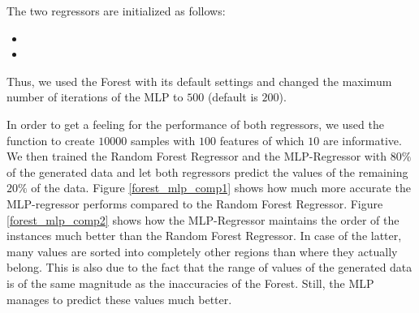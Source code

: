 	The two regressors are initialized as follows:
	\begin{itemize}
		\item {}
		\item {}
	\end{itemize}
	Thus, we used the Forest with its default settings and changed the maximum number of iterations of the MLP to $500$ (default is $200$).
	
	In order to get a feeling for the performance of both regressors, we used the function  to create $10000$ samples with $100$ features of which $10$ are informative. We then trained the Random Forest Regressor and the MLP-Regressor with $80\%$ of the generated data and let both regressors predict the values of the remaining $20\%$ of the data. Figure \ref{forest_mlp_comp1} shows how much more accurate the MLP-regressor performs compared to the Random Forest Regressor. Figure \ref{forest_mlp_comp2} shows how the MLP-Regressor maintains the order of the instances much better than the Random Forest Regressor. In case of the latter, many values are sorted into completely other regions than where they actually belong. This is also due to the fact that the range of values of the generated data is of the same magnitude as the inaccuracies of the Forest. Still, the MLP manages to predict these values much better.

